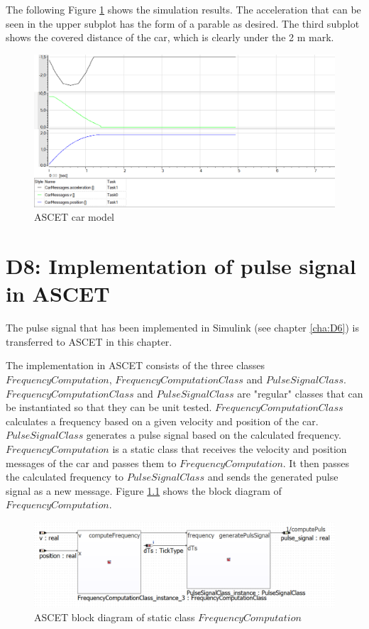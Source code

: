 The following Figure \ref{fig:D7_result} shows the simulation results.
The acceleration that can be seen in the upper subplot has the form of a parable as desired.
The third subplot shows the covered distance of the car, which is clearly under the 2 m mark. 

\begin{figure}[H]
\centering
\includegraphics[width=1\textwidth]{images/ascet_acceleration.png}
\caption{ASCET car model}
\label{fig:D7_result}
\end{figure}

\chapter{D8: Implementation of pulse signal in ASCET}\label{cha:D8}

The pulse signal that has been implemented in Simulink (see chapter \ref{cha:D6}) is transferred to ASCET in this chapter.

The implementation in ASCET consists of the three classes $FrequencyComputation$, $FrequencyComputationClass$ and $PulseSignalClass$. $FrequencyComputationClass$ and $PulseSignalClass$ are "regular" classes that can be instantiated so that they can be unit tested. $FrequencyComputationClass$ calculates a frequency based on a given velocity and position of the car. $PulseSignalClass$ generates a pulse signal based on the calculated frequency.
$FrequencyComputation$ is a static class that receives the velocity and position messages of the car and passes them to $FrequencyComputation$. It then passes the calculated frequency to $PulseSignalClass$ and sends the generated pulse signal as a new message. Figure \ref{fig:BlockdiagrammFrequencyComputation} shows the block diagram of $FrequencyComputation$.

\begin{figure}[H]
\centering
\includegraphics[width=1\textwidth]{images/Blockdiagramm_FrequencyComputation.png}
\caption{ASCET block diagram of static class $FrequencyComputation$}
\label{fig:BlockdiagrammFrequencyComputation}
\end{figure}

